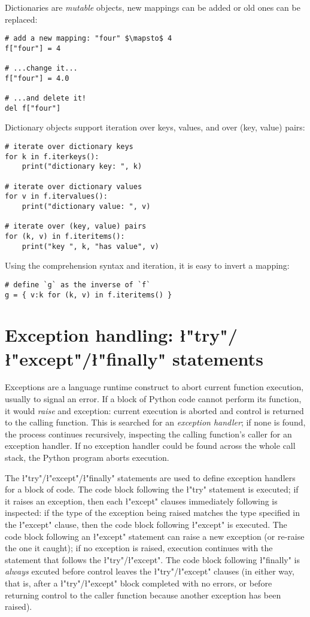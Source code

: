 Dictionaries are \emph{mutable} objects, new mappings can be added or
old ones can be replaced:
\begin{lstlisting}
# add a new mapping: "four" $\mapsto$ 4
f["four"] = 4

# ...change it... 
f["four"] = 4.0

# ...and delete it!
del f["four"]
\end{lstlisting}

Dictionary objects support iteration over keys, values, and over (key,
value) pairs:
\begin{lstlisting}
# iterate over dictionary keys
for k in f.iterkeys(): 
    print("dictionary key: ", k)

# iterate over dictionary values
for v in f.itervalues(): 
    print("dictionary value: ", v)

# iterate over (key, value) pairs
for (k, v) in f.iteritems(): 
    print("key ", k, "has value", v)
\end{lstlisting}
Using the comprehension syntax and iteration, it is easy to invert a
mapping:
\begin{lstlisting}
# define `g` as the inverse of `f`
g = { v:k for (k, v) in f.iteritems() }
\end{lstlisting}


\section[Exception handling]{Exception handling: \l"try"/\l"except"/\l"finally" statements}
\label{sec:try-except-finally}

Exceptions are a language runtime construct to abort current function
execution, usually to signal an error.  If a block of Python code
cannot perform its function, it would \emph{raise} and exception:
current execution is aborted and control is returned to the calling
function.  This is searched for an \emph{exception handler}; if none
is found, the process continues recursively, inspecting the calling
function's caller for an exception handler.  If no exception handler
could be found across the whole call stack, the Python program aborts
execution.

The \l"try"/\l"except"/\l"finally" statements
are used to define exception handlers for a block of code.  The code
block following the \l"try" statement is executed; if it
raises an exception, then each \l"except" clauses immediately
following is inspected: if the type of the exception being raised
matches the type specified in the \l"except" clause, then the
code block following \l"except" is executed. The code block
following an \l"except" statement can raise a new exception
(or re-raise the one it caught); if no exception is raised, execution
continues with the statement that follows the
\l"try"/\l"except".  The code block following
\l"finally" is \emph{always} excuted before control leaves the
\l"try"/\l"except" clauses (in either way, that is,
after a \l"try"/\l"except" block completed with no
errors, or before returning control to the caller function because
another exception has been raised).

